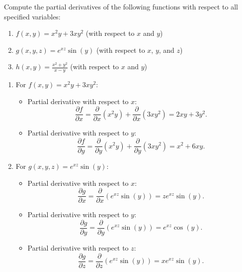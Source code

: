 \exampleline
\begin{example}
Compute the partial derivatives of the following functions with respect to all specified variables:
\begin{enumerate}
    \item \( f(x, y) = x^2y + 3xy^2 \) (with respect to \( x \) and \( y \))
    \item \( g(x, y, z) = e^{xz} \sin(y) \) (with respect to \( x \), \( y \), and \( z \))
    \item \( h(x, y) = \frac{x^2 + y^2}{x - y} \) (with respect to \( x \) and \( y \))
\end{enumerate}

\begin{solution}
\begin{enumerate}
    \item For \( f(x, y) = x^2y + 3xy^2 \):
    \begin{itemize}
        \item Partial derivative with respect to \( x \):
        \[
        \frac{\partial f}{\partial x} = \frac{\partial}{\partial x}(x^2y) + \frac{\partial}{\partial x}(3xy^2) = 2xy + 3y^2.
        \]
        \item Partial derivative with respect to \( y \):
        \[
        \frac{\partial f}{\partial y} = \frac{\partial}{\partial y}(x^2y) + \frac{\partial}{\partial y}(3xy^2) = x^2 + 6xy.
        \]
    \end{itemize}

    \item For \( g(x, y, z) = e^{xz} \sin(y) \):
    \begin{itemize}
        \item Partial derivative with respect to \( x \):
        \[
        \frac{\partial g}{\partial x} = \frac{\partial}{\partial x}\left(e^{xz} \sin(y)\right) = z e^{xz} \sin(y).
        \]
        \item Partial derivative with respect to \( y \):
        \[
        \frac{\partial g}{\partial y} = \frac{\partial}{\partial y}\left(e^{xz} \sin(y)\right) = e^{xz} \cos(y).
        \]
        \item Partial derivative with respect to \( z \):
        \[
        \frac{\partial g}{\partial z} = \frac{\partial}{\partial z}\left(e^{xz} \sin(y)\right) = x e^{xz} \sin(y).
        \]
    \end{itemize}


\end{enumerate}
\end{solution}
\end{example}
